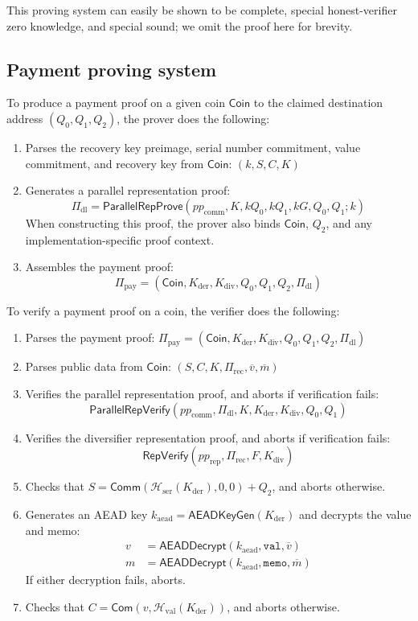 \documentclass{llncs}
\newcommand{\hash}{\mathcal{H}}
\newcommand{\func}[1]{\mathsf{#1}}
\newcommand{\com}{\func{Com}}
\newcommand{\comm}{\func{Comm}}
\begin{document}
This proving system can easily be shown to be complete, special honest-verifier zero knowledge, and special sound; we omit the proof here for brevity.


\subsection{Payment proving system}

To produce a payment proof on a given coin $\func{Coin}$ to the claimed destination address $(Q_0,Q_1,Q_2)$, the prover does the following:
\begin{enumerate}
    \item Parses the recovery key preimage, serial number commitment, value commitment, and recovery key from $\func{Coin}$: $(k,S,C,K)$
    \item Generates a parallel representation proof:
    $$\Pi_{\text{dl}} = \func{ParallelRepProve}(pp_{\text{comm}},K,kQ_0,kQ_1,kG,Q_0,Q_1 ; k)$$
    When constructing this proof, the prover also binds $\func{Coin}$, $Q_2$, and any implementation-specific proof context.
    \item Assembles the payment proof:
    $$\Pi_{\text{pay}} = (\func{Coin},K_{\text{der}},K_{\text{div}},Q_0,Q_1,Q_2,\Pi_{\text{dl}})$$
\end{enumerate}

To verify a payment proof on a coin, the verifier does the following:
\begin{enumerate}
    \item Parses the payment proof: $\Pi_{\text{pay}} = (\func{Coin},K_{\text{der}},K_{\text{div}},Q_0,Q_1,Q_2,\Pi_{\text{dl}})$
    \item Parses public data from $\func{Coin}$: $(S,C,K,\Pi_{\text{rec}},\overline{v},\overline{m})$
    \item Verifies the parallel representation proof, and aborts if verification fails:
    $$\func{ParallelRepVerify}(pp_{\text{comm}},\Pi_{\text{dl}},K,K_{\text{der}},K_{\text{div}},Q_0,Q_1)$$
    \item Verifies the diversifier representation proof, and aborts if verification fails:
    $$\func{RepVerify}(pp_{\text{rep}},\Pi_{\text{rec}},F,K_{\text{div}})$$
    \item Checks that $S = \comm(\hash_{\text{ser}}(K_{\text{der}}),0,0) + Q_2$, and aborts otherwise.
    \item Generates an AEAD key $k_{\text{aead}} = \func{AEADKeyGen}(K_{\text{der}})$ and decrypts the value and memo:
    \begin{align*}
        v &= \func{AEADDecrypt}(k_{\text{aead}},\texttt{val},\overline{v}) \\
        m &= \func{AEADDecrypt}(k_{\text{aead}},\texttt{memo},\overline{m})
    \end{align*}
    If either decryption fails, aborts.
    \item Checks that $C = \com(v, \hash_{\text{val}}(K_{\text{der}}))$, and aborts otherwise.
\end{enumerate}
\end{document}
